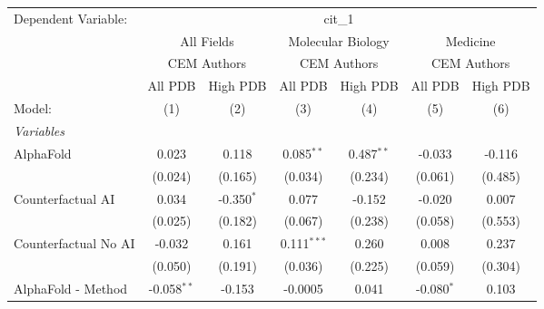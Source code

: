 \begingroup
\centering
\begin{tabular}{lcccccc}
   \tabularnewline \midrule \midrule
   Dependent Variable: & \multicolumn{6}{c}{cit\_1}\\
 & \multicolumn{2}{c}{All Fields} & \multicolumn{2}{c}{Molecular Biology} & \multicolumn{2}{c}{Medicine} \\
\cmidrule(lr){2-3} \cmidrule(lr){4-5} \cmidrule(lr){6-7}
 & \multicolumn{2}{c}{CEM Authors} & \multicolumn{2}{c}{CEM Authors} & \multicolumn{2}{c}{CEM Authors} \\
\cmidrule(lr){2-3} \cmidrule(lr){4-5} \cmidrule(lr){6-7}
 & \multicolumn{1}{c}{All PDB} & \multicolumn{1}{c}{High PDB} & \multicolumn{1}{c}{All PDB} & \multicolumn{1}{c}{High PDB} & \multicolumn{1}{c}{All PDB} & \multicolumn{1}{c}{High PDB} \\
\cmidrule(lr){2-2} \cmidrule(lr){3-3} \cmidrule(lr){4-4} \cmidrule(lr){5-5} \cmidrule(lr){6-6} \cmidrule(lr){7-7}
   Model:                                                     & (1)            & (2)           & (3)            & (4)          & (5)          & (6)\\  
   \midrule
   \emph{Variables}\\
   AlphaFold                                                  & 0.023          & 0.118         & 0.085$^{**}$   & 0.487$^{**}$ & -0.033       & -0.116\\   
                                                              & (0.024)        & (0.165)       & (0.034)        & (0.234)      & (0.061)      & (0.485)\\   
   Counterfactual AI                                          & 0.034          & -0.350$^{*}$  & 0.077          & -0.152       & -0.020       & 0.007\\   
                                                              & (0.025)        & (0.182)       & (0.067)        & (0.238)      & (0.058)      & (0.553)\\   
   Counterfactual No AI                                       & -0.032         & 0.161         & 0.111$^{***}$  & 0.260        & 0.008        & 0.237\\   
                                                              & (0.050)        & (0.191)       & (0.036)        & (0.225)      & (0.059)      & (0.304)\\   
   AlphaFold - Method                                         & -0.058$^{**}$  & -0.153        & -0.0005        & 0.041        & -0.080$^{*}$ & 0.103\\   

\end{tabular}
